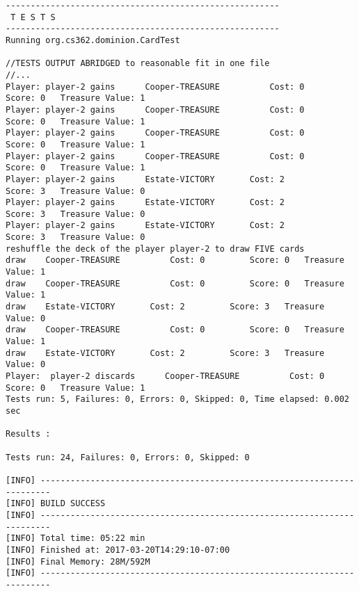\begin{lstlisting}
-------------------------------------------------------
 T E S T S
-------------------------------------------------------
Running org.cs362.dominion.CardTest

//TESTS OUTPUT ABRIDGED to reasonable fit in one file
//...
Player: player-2 gains  	Cooper-TREASURE 		 Cost: 0 		 Score: 0 	Treasure Value: 1
Player: player-2 gains  	Cooper-TREASURE 		 Cost: 0 		 Score: 0 	Treasure Value: 1
Player: player-2 gains  	Cooper-TREASURE 		 Cost: 0 		 Score: 0 	Treasure Value: 1
Player: player-2 gains  	Cooper-TREASURE 		 Cost: 0 		 Score: 0 	Treasure Value: 1
Player: player-2 gains  	Estate-VICTORY 		 Cost: 2 		 Score: 3 	Treasure Value: 0
Player: player-2 gains  	Estate-VICTORY 		 Cost: 2 		 Score: 3 	Treasure Value: 0
Player: player-2 gains  	Estate-VICTORY 		 Cost: 2 		 Score: 3 	Treasure Value: 0
reshuffle the deck of the player player-2 to draw FIVE cards
draw  	Cooper-TREASURE 		 Cost: 0 		 Score: 0 	Treasure Value: 1
draw  	Cooper-TREASURE 		 Cost: 0 		 Score: 0 	Treasure Value: 1
draw  	Estate-VICTORY 		 Cost: 2 		 Score: 3 	Treasure Value: 0
draw  	Cooper-TREASURE 		 Cost: 0 		 Score: 0 	Treasure Value: 1
draw  	Estate-VICTORY 		 Cost: 2 		 Score: 3 	Treasure Value: 0
Player:  player-2 discards  	Cooper-TREASURE 		 Cost: 0 		 Score: 0 	Treasure Value: 1
Tests run: 5, Failures: 0, Errors: 0, Skipped: 0, Time elapsed: 0.002 sec

Results :

Tests run: 24, Failures: 0, Errors: 0, Skipped: 0

[INFO] ------------------------------------------------------------------------
[INFO] BUILD SUCCESS
[INFO] ------------------------------------------------------------------------
[INFO] Total time: 05:22 min
[INFO] Finished at: 2017-03-20T14:29:10-07:00
[INFO] Final Memory: 28M/592M
[INFO] ------------------------------------------------------------------------
\end{lstlisting}
